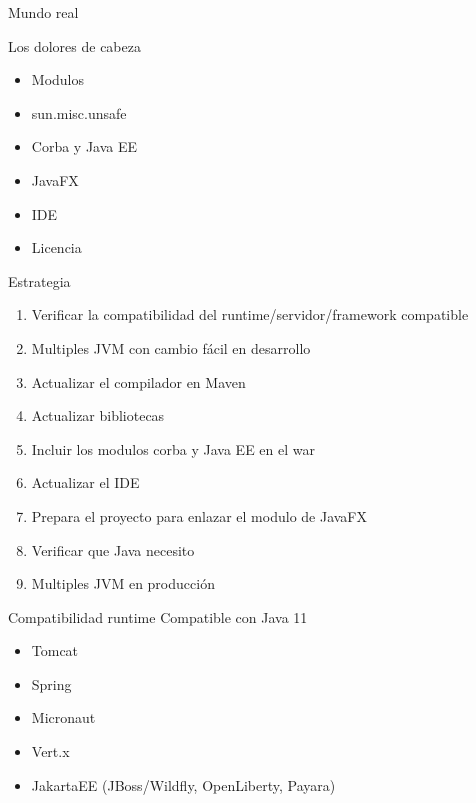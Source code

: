 \documentclass[aspectratio=169]{beamer}
\begin{document}
\begin{frame}[fragile]{Mundo real}\scriptsize

    Los dolores de cabeza
    \begin{itemize}
        \item Modulos
        \item sun.misc.unsafe
        \item Corba y Java EE
        \item JavaFX
        \item IDE
        \item Licencia
    \end{itemize}
    
    Estrategia
    \begin{enumerate}
        \item Verificar la compatibilidad del runtime/servidor/framework compatible
        \item Multiples JVM con cambio fácil en desarrollo
        \item Actualizar el compilador en Maven
        \item Actualizar bibliotecas
        \item Incluir los modulos corba y Java EE en el war
        \item Actualizar el IDE
        \item Prepara el proyecto para enlazar el modulo de JavaFX
        \item Verificar que Java necesito
        \item Multiples JVM en producción
    \end{enumerate}
\end{frame}

\begin{frame}[fragile]{Compatibilidad runtime}
    Compatible con Java 11
    \begin{itemize}
        \item Tomcat
        \item Spring
        \item Micronaut
        \item Vert.x
        \item JakartaEE (JBoss/Wildfly, OpenLiberty, Payara)
    \end{itemize}
\end{frame}
\end{document}

